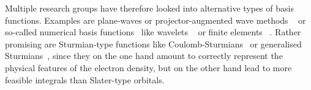 Multiple research groups have therefore looked into alternative types of basis functions.
Examples are plane-waves or projector-augmented wave methods%
~\cite{Kresse1996,Kresse1999,Mortensen2005,Enkovaara2010} or
so-called numerical basis functions~\cite{Frediani2015}
like wavelets%
~\cite{Bischoff2011,Bischoff2012,Bischoff2013,Bischoff2014,Bischoff2014a,Bischoff2017}
or finite elements%
~\cite{Tsuchida1995,Soler2002,Lehtovaara2009,Alizadegan2010,Avery2011PhD,Davydov2015,Boffi2016}.
Rather promising are Sturmian-type functions
like Coulomb-Sturmians~\cite{Shull1959,Rotenberg1962,Rotenberg1970,Gruzdev1990,Hoggan2009,Randazzo2010}
or generalised Sturmians~\cite{Avery2006,Avery2011PhD,Avery2011,Morales2016,Avery2017,Randazzo2015,Granados2016},
since they on the one hand amount to correctly represent
the physical features of the electron density,
but on the other hand lead to more feasible integrals than Slater-type orbitals.

